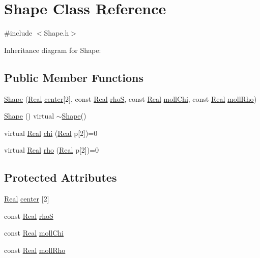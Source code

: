 \hypertarget{class_shape}{}\section{Shape Class Reference}
\label{class_shape}


{\ttfamily \#include $<$Shape.\+h$>$}



Inheritance diagram for Shape\+:
\subsection*{Public Member Functions}
\begin{DoxyCompactItemize}
\item 
\hyperlink{class_shape_aec4449bb3671eff0b513b753f5199eb8}{Shape} (\hyperlink{_h_d_f5_dumper_8h_a445a5f0e2a34c9d97d69a3c2d1957907}{Real} \hyperlink{class_shape_a865a04fe67fc785b3cbb44806a214248}{center}\mbox{[}2\mbox{]}, const \hyperlink{_h_d_f5_dumper_8h_a445a5f0e2a34c9d97d69a3c2d1957907}{Real} \hyperlink{class_shape_a181acdc3063f20a15ba1807f7b6a5d10}{rho\+S}, const \hyperlink{_h_d_f5_dumper_8h_a445a5f0e2a34c9d97d69a3c2d1957907}{Real} \hyperlink{class_shape_ad7d270a8ffc4056d4990424dffdd0488}{moll\+Chi}, const \hyperlink{_h_d_f5_dumper_8h_a445a5f0e2a34c9d97d69a3c2d1957907}{Real} \hyperlink{class_shape_af5aa25175d49bc463fada7b11f2735e1}{moll\+Rho})
\item 
\hyperlink{class_shape_aae7c36fee331dc62680d3fbeb82671a2}{Shape} () virtual $\sim$\hyperlink{class_shape}{Shape}()
\item 
virtual \hyperlink{_h_d_f5_dumper_8h_a445a5f0e2a34c9d97d69a3c2d1957907}{Real} \hyperlink{class_shape_a4f73c637114b82612ba4cfde42886f25}{chi} (\hyperlink{_h_d_f5_dumper_8h_a445a5f0e2a34c9d97d69a3c2d1957907}{Real} p\mbox{[}2\mbox{]})=0
\item 
virtual \hyperlink{_h_d_f5_dumper_8h_a445a5f0e2a34c9d97d69a3c2d1957907}{Real} \hyperlink{class_shape_af55591d6633578cbea6132f52d104cdb}{rho} (\hyperlink{_h_d_f5_dumper_8h_a445a5f0e2a34c9d97d69a3c2d1957907}{Real} p\mbox{[}2\mbox{]})=0
\end{DoxyCompactItemize}
\subsection*{Protected Attributes}
\begin{DoxyCompactItemize}
\item 
\hyperlink{_h_d_f5_dumper_8h_a445a5f0e2a34c9d97d69a3c2d1957907}{Real} \hyperlink{class_shape_a865a04fe67fc785b3cbb44806a214248}{center} \mbox{[}2\mbox{]}
\item 
const \hyperlink{_h_d_f5_dumper_8h_a445a5f0e2a34c9d97d69a3c2d1957907}{Real} \hyperlink{class_shape_a181acdc3063f20a15ba1807f7b6a5d10}{rho\+S}
\item 
const \hyperlink{_h_d_f5_dumper_8h_a445a5f0e2a34c9d97d69a3c2d1957907}{Real} \hyperlink{class_shape_ad7d270a8ffc4056d4990424dffdd0488}{moll\+Chi}
\item 
const \hyperlink{_h_d_f5_dumper_8h_a445a5f0e2a34c9d97d69a3c2d1957907}{Real} \hyperlink{class_shape_af5aa25175d49bc463fada7b11f2735e1}{moll\+Rho}
\end{DoxyCompactItemize}


